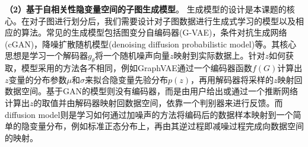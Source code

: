\documentclass[12pt,UTF8,AutoFakeBold=2,a4paper]{ctexart} %
\begin{document}


\textbf{（2）基于自相关性隐变量空间的子图生成模型}。
生成模型的设计是本课题的核心。在对子图进行划分后，我们需要设计对子图数据进行生成式学习的模型以及相应的算法。常见的生成模型包括图变分自编码器(G-VAE)，条件对抗生成网络(cGAN)，降噪扩散随机模型(denoising diffusion probabilistic model)等。其核心思想是学习一个解码器$g_\theta$将一个随机噪声向量$z$映射到实际数据上。针对$z$如何获取，模型采用的方法各不相同，例如GraphVAE通过一个编码器函数$f(G)$计算出$z$变量的分布参数$\mu$和$\sigma$来拟合隐变量先验分布$p(z)$，再用解码器将采样的$z$映射回数据空间。基于GAN的模型则没有编码器，而是由用户给出或通过一个推断网络计算出$z$的取值并由解码器映射回数据空间，依靠一个判别器来进行反馈。而diffusion model则是学习如何通过加噪声的方法将编码后的数据样本映射到一个简单的隐变量分布，例如标准正态分布上，再由其逆过程即减噪过程完成向数据空间的映射。
\end{document}
